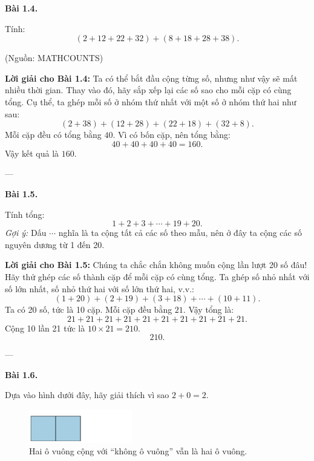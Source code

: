 \documentclass[12pt,a4paper]{book}
\newenvironment{problem}[1][]{
  \par\noindent\textbf{Bài #1.}\ \ignorespaces
}{\par}
\begin{document}
\begin{problem}[1.4]
Tính:
\[
(2 + 12 + 22 + 32) + (8 + 18 + 28 + 38).
\]
\begin{flushright}\small(Nguồn: MATHCOUNTS)\end{flushright}
\end{problem}

\noindent\textbf{Lời giải cho Bài 1.4:}  
Ta có thể bắt đầu cộng từng số, nhưng như vậy sẽ mất nhiều thời gian.  
Thay vào đó, hãy sắp xếp lại các số sao cho mỗi cặp có cùng tổng.  
Cụ thể, ta ghép mỗi số ở nhóm thứ nhất với một số ở nhóm thứ hai như sau:
\[
(2 + 38) + (12 + 28) + (22 + 18) + (32 + 8).
\]
Mỗi cặp đều có tổng bằng \(40\).  
Vì có bốn cặp, nên tổng bằng:
\[
40 + 40 + 40 + 40 = 160.
\]
Vậy kết quả là \(\boxed{160}.\)
\medskip

---

\begin{problem}[1.5]
Tính tổng:
\[
1 + 2 + 3 + \cdots + 19 + 20.
\]
\textit{Gợi ý:} Dấu \texttt{$\cdots$} nghĩa là ta cộng tất cả các số theo mẫu,  
nên ở đây ta cộng các số nguyên dương từ 1 đến 20.
\end{problem}

\noindent\textbf{Lời giải cho Bài 1.5:}  
Chúng ta chắc chắn không muốn cộng lần lượt 20 số đâu!  
Hãy thử ghép các số thành cặp để mỗi cặp có cùng tổng.  
Ta ghép số nhỏ nhất với số lớn nhất, số nhỏ thứ hai với số lớn thứ hai, v.v.:
\[
(1 + 20) + (2 + 19) + (3 + 18) + \cdots + (10 + 11).
\]
Ta có 20 số, tức là 10 cặp.  
Mỗi cặp đều bằng \(21\).  
Vậy tổng là:
\[
21 + 21 + 21 + 21 + 21 + 21 + 21 + 21 + 21 + 21.
\]
Cộng 10 lần 21 tức là \(10 \times 21 = 210.\)
\[
\boxed{210}.
\]

---

\begin{problem}[1.6]
Dựa vào hình dưới đây, hãy giải thích vì sao \(2 + 0 = 2.\)

\begin{figure}[h!]
  \centering
  \includegraphics[width=0.4\textwidth]{img/fig-prob1.6.pdf}
  \caption*{\small Hai ô vuông cộng với “không ô vuông” vẫn là hai ô vuông.}
\end{figure}
\end{problem}
\end{document}
